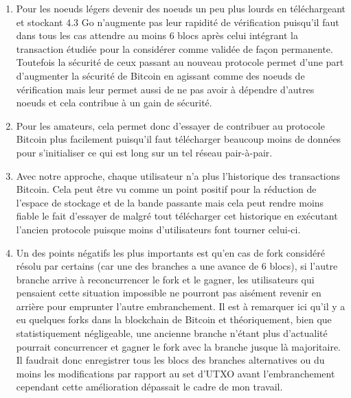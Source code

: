 \documentclass[12pt,a4paper]{article}
\begin{document}
	\begin{enumerate}
		\item Pour les noeuds légers devenir des noeuds un peu plus lourds en téléchargeant et stockant 4.3 Go n'augmente pas leur rapidité de vérification puisqu'il faut dans tous les cas attendre au moins 6 blocs après celui intégrant la transaction étudiée pour la considérer comme validée de façon permanente. Toutefois la sécurité de ceux passant au nouveau protocole permet d'une part d'augmenter la sécurité de Bitcoin en agissant comme des noeuds de vérification mais leur permet aussi de ne pas avoir à dépendre d'autres noeuds et cela contribue à un gain de sécurité.
		\item Pour les amateurs, cela permet donc d'essayer de contribuer au protocole Bitcoin plus facilement puisqu'il faut télécharger beaucoup moins de données pour s'initialiser ce qui est long sur un tel réseau pair-à-pair.
		\item Avec notre approche, chaque utilisateur n'a plus l'historique des transactions Bitcoin. Cela peut être vu comme un point positif pour la réduction de l'espace de stockage et de la bande passante mais cela peut rendre moins fiable le fait d'essayer de malgré tout télécharger cet historique en exécutant l'ancien protocole puisque moins d'utilisateurs font tourner celui-ci.
		\item Un des points négatifs les plus importants est qu'en cas de fork considéré résolu par certains (car une des branches a une avance de 6 blocs), si l'autre branche arrive à reconcurrencer le fork et le gagner, les utilisateurs qui pensaient cette situation impossible ne pourront pas aisément revenir en arrière pour emprunter l'autre embranchement. Il est à remarquer ici qu'il y a eu quelques forks dans la blockchain de Bitcoin et théoriquement, bien que statistiquement négligeable, une ancienne branche n'étant plus d'actualité pourrait concurrencer et gagner le fork avec la branche jusque là majoritaire. Il faudrait donc enregistrer tous les blocs des branches alternatives ou du moins les modifications par rapport au set d'UTXO avant l'embranchement cependant cette amélioration dépassait le cadre de mon travail. %
	\end{enumerate}
	
	
\end{document}
